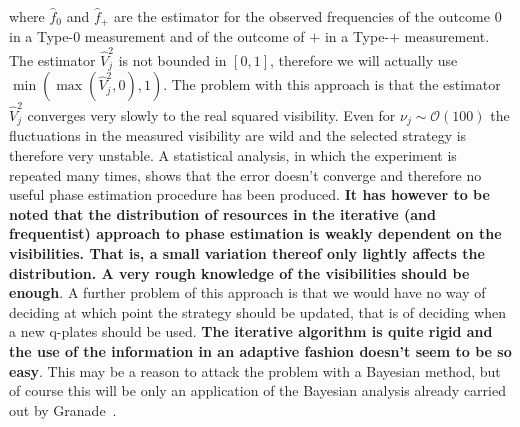 \documentclass[aps, pra, 10pt, twocolumn, superscriptaddress,floatfix]{revtex4-1}
\begin{document}
where $\hat{f}_0$ and $\hat{f}_+$ are the estimator for the observed frequencies of the outcome $0$ in a Type-$0$ measurement and of the outcome of $+$ in a Type-$+$ measurement. The estimator $\hat{V}^2_j$ is not bounded in $\left[0, 1 \right]$, therefore we will actually use $\min{( \max{( \hat{V}^2_j, 0 )}, 1 )}$. The problem with this approach is that the estimator $\hat{V}^2_j$ converges very slowly to the real squared visibility. Even for $\nu_j \sim \mathcal{O} (100)$ the fluctuations in the measured visibility are wild and the selected strategy is therefore very unstable. A statistical analysis, in which the experiment is repeated many times, shows that the error doesn't converge and therefore no useful phase estimation procedure has been produced. \textbf{It has however to be noted that the distribution of resources in the iterative (and frequentist) approach to phase estimation is weakly dependent on the visibilities. That is, a small variation thereof only lightly affects the distribution. A very rough knowledge of the visibilities should be enough}. A further problem of this approach is that we would have no way of deciding at which point the strategy should be updated, that is of deciding when a new q-plates should be used. \textbf{The iterative algorithm is quite rigid and the use of the information in an adaptive fashion doesn't seem to be so easy}. This may be a reason to attack the problem with a Bayesian method, but of course this will be only an application of the Bayesian analysis already carried out by Granade~\cite{Granade2012}.
%
\end{document}
